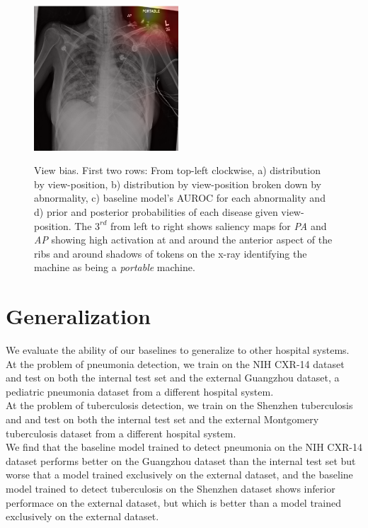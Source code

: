 \documentclass[12pt,oneside,a4paper]{report}
\begin{document}
\begin{figure}[H]
  \includegraphics[width=0.48\textwidth]{images/view2_cropped}\\[0.01\textwidth]
  \caption{View bias. First two rows: From top-left clockwise, a) distribution by view-position, b) distribution by view-position broken down by abnormality, c) baseline model's AUROC for each abnormality and d) prior and posterior probabilities of each disease given view-position. The $3^{rd}$ from left to right shows saliency maps for \emph{PA} and \emph{AP} showing high activation at and around the anterior aspect of the ribs and around shadows of tokens on the x-ray identifying the machine as being a \emph{portable} machine.}
  \label{fig:view_bias}
\end{figure}

\section{Generalization}
We evaluate the ability of our baselines to generalize to other hospital
systems. At the problem of pneumonia detection, we train on the NIH CXR-14
dataset and test on both the internal test set and the external Guangzhou
dataset, a pediatric pneumonia dataset from a different hospital system.\\

At the problem of tuberculosis detection, we train on the Shenzhen tuberculosis
and and test on both the internal test set and the external Montgomery
tuberculosis
dataset from a different hospital system.\\

We find that the baseline model trained to detect pneumonia on the NIH CXR-14
dataset performs better on the Guangzhou dataset than the internal test set but
worse that a model trained exclusively on the external dataset, and the baseline
model trained to detect tuberculosis on the Shenzhen dataset shows inferior
performace on the external dataset, but which is better than a model trained
exclusively on the external dataset.
\end{document}
